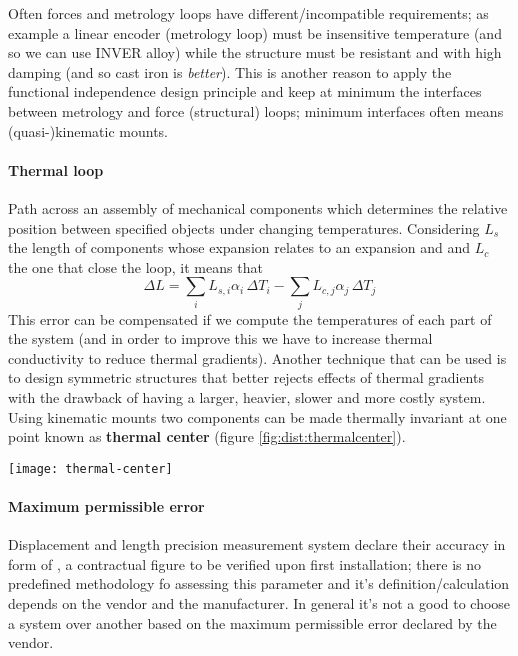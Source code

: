	Often forces and metrology loops have different/incompatible requirements; as example a linear encoder (metrology loop) must be insensitive temperature (and so we can use INVER alloy) while the structure must be resistant and with high damping (and so cast iron is \textit{better}). This is another reason to apply the functional independence design principle and keep at minimum the interfaces between metrology and force (structural) loops; minimum interfaces often means (quasi-)kinematic mounts.
	
	\paragraph{Thermal loop} Path across an assembly of mechanical components which determines the relative position between specified objects under changing temperatures. Considering $L_s$ the length of components whose expansion relates to an expansion and and $L_c$ the one that close the loop, it means that
	\[ \Delta L = \sum_i L_{s,i} \alpha_i \, \Delta T_i - \sum _j L_{c,j} \alpha_j\, \Delta T_j \]
	This error can be compensated if we compute the temperatures of each part of the system (and in order to improve this we have to increase thermal conductivity to reduce thermal gradients). Another technique that can be used is to design symmetric structures that better rejects effects of thermal gradients with the drawback of having a larger, heavier, slower and more costly system.\\
	Using kinematic mounts two components can be made thermally invariant at one point known as \textbf{thermal center} (figure \ref{fig:dist:thermalcenter}).
	
	\begin{SCfigure}[2][bht]
		\centering \texttt{[image: thermal-center]}
		\caption{example of kinematic mount that allow to compensate temperature variation.} \label{fig:dist:thermalcenter}	
	\end{SCfigure}
	
	\paragraph{Maximum permissible error} Displacement and length precision measurement system declare their accuracy in form of , a contractual figure to be verified upon first installation; there is no predefined methodology fo assessing this parameter and it's definition/calculation depends on the vendor and the manufacturer. In general it's not a good to choose a system over another based on the maximum permissible error declared  by the vendor.
	
